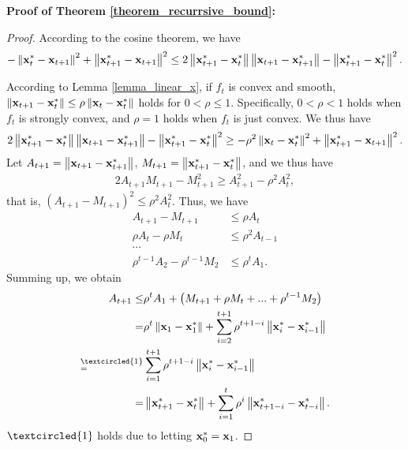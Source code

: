 \documentclass{article}
\begin{document}
\textbf{Proof of Theorem \ref{theorem_recurrsive_bound}:}
\begin{proof}
According to the cosine theorem, we have 
\begin{align}
\label{equa_cosine}
-  \left\lVert{\bf x}_t^{\ast} - {\bf x}_{t+1}\right\rVert^2   + \left\lVert {\bf x}_{t+1}^{\ast} - {\bf x}_{t+1} \right\rVert^2 \le  2 \left\lVert{\bf x}_{t+1}^{\ast} - {\bf x}_t^{\ast}\right\rVert \left\lVert{\bf x}_{t+1} - {\bf x}_{t+1}^{\ast}\right\rVert - \left\lVert{\bf x}_{t+1}^{\ast} - {\bf x}_t^{\ast}\right\rVert^2.
\end{align} 

According to Lemma \ref{lemma_linear_x}, if $f_t$ is convex and smooth,  $\left\lVert{\bf x}_{t+1} - {\bf x}_t^{\ast}\right\rVert  \le \rho \left\lVert{\bf x}_{t} - {\bf x}_t^{\ast}\right\rVert$ holds for $0<\rho\le 1$. Specifically, $0<\rho <1$ holds when $f_t$ is strongly convex, and $\rho=1$ holds when $f_t$ is just convex.  We thus have 
\begin{align}
\nonumber
2 \left\lVert{\bf x}_{t+1}^{\ast} - {\bf x}_t^{\ast}\right\rVert \left\lVert{\bf x}_{t+1} - {\bf x}_{t+1}^{\ast}\right\rVert - \left\lVert{\bf x}_{t+1}^{\ast} - {\bf x}_t^{\ast}\right\rVert^2 \ge -  \rho^2 \left\lVert{\bf x}_{t} - {\bf x}_t^{\ast}\right\rVert^2   + \left\lVert {\bf x}_{t+1}^{\ast} - {\bf x}_{t+1} \right\rVert^2.
\end{align} Let $A_{t+1} = \left\lVert{\bf x}_{t+1} - {\bf x}_{t+1}^{\ast}\right\rVert$, $M_{t+1} = \left\lVert{\bf x}_{t+1}^{\ast} - {\bf x}_t^{\ast}\right\rVert$, and we thus have 
\begin{align}
\nonumber
2A_{t+1}M_{t+1} - M_{t+1}^2 \ge A_{t+1}^2 - \rho^2 A_t^2,
\end{align} that is, $(A_{t+1} - M_{t+1})^2 \le \rho^2A_t^2$. Thus, we have 
\begin{align}
\nonumber
A_{t+1} - M_{t+1} &\le \rho A_t \\ \nonumber
\rho A_{t} - \rho M_{t} &\le \rho^2 A_{t-1} \\ \nonumber
\cdots &  \\ \nonumber
\rho^{t-1} A_{2} - \rho^{t-1} M_{2} &\le \rho^t A_{1}.
\end{align} Summing up, we obtain
\begin{align}
\nonumber
A_{t+1} \le &  \rho^{t}A_1 + \left( M_{t+1} + \rho M_{t} + ... + \rho^{t-1}M_2 \right) \\ \nonumber
= & \rho^{t}\lrnorm{\x_1 - \x_1^\ast} + \sum_{i=2}^{t+1} \rho^{t+1-i} \lrnorm{\x_i^{\ast} - \x_{i-1}^{\ast}} \\ \nonumber
\refabovecir{=}{\textcircled{1}} & \sum_{i=1}^{t+1} \rho^{t+1-i} \lrnorm{\x_i^{\ast} - \x_{i-1}^{\ast}}   \\ \label{equa_A_upper_bound}
= & \lrnorm{\x_{t+1}^{\ast} - \x_t^{\ast}}  +  \sum\limits_{i=1}^{t}\rho^i \lrnorm{\x_{t+1-i}^{\ast} - \x_{t-i}^{\ast}}. 
\end{align} $\textcircled{1}$ holds due to letting ${\bf x}_0^\ast = {\bf x}_1$.


\end{proof}
\end{document}
